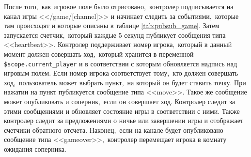 \documentclass[14pt,a4paper]{report}
\begin{document}
После того,~как игровое поле было отрисовано,~контролер подписывается на канал игры <</game/[channel]>> и начинает следить за событиями,~которые там происходят и которые описаны в таблице \ref{tab:pubsub_game}. Затем запускается счетчик,~который каждые 5 секунд публикует сообщения типа <<heartbeat>>. Контролер поддерживает номер игрока,~который в данный момент должен совершать ход,~который хранится в переменной \lstinline{$scope.current_player} и в соответствии с которым обновляется надпись над игровым полем. Если номер игрока соответствует тому,~кто должен совершать ход,~пользователь может выбрать пункт,~на который он будет ставить точку. При нажатии на пункт публикуется сообщение типа <<move>>. Такое же сообщение может опубликовать и соперник,~если он совершает ход. Контролер следит за этими сообщениями и обновляет состояние игры в соответствии с ними. Также контролер следит за предложениями о ничье или завершении игры и отображает счетчики обратного отсчета. Наконец,~если на канале будет опубликовано сообщение типа <<gameover>>,~контролер перемещает игрока в комнату ожидания соперника.
\end{document}
